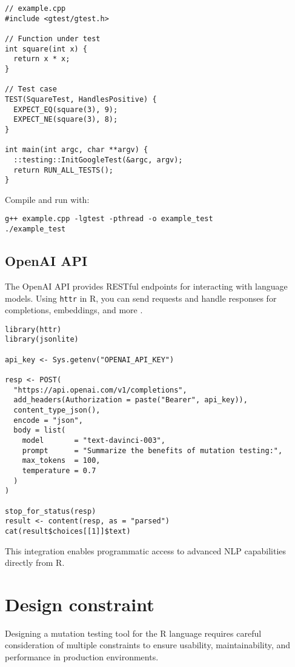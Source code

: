 \begin{verbatim}
// example.cpp
#include <gtest/gtest.h>

// Function under test
int square(int x) {
  return x * x;
}

// Test case
TEST(SquareTest, HandlesPositive) {
  EXPECT_EQ(square(3), 9);
  EXPECT_NE(square(3), 8);
}

int main(int argc, char **argv) {
  ::testing::InitGoogleTest(&argc, argv);
  return RUN_ALL_TESTS();
}
\end{verbatim}

Compile and run with:
\begin{verbatim}
g++ example.cpp -lgtest -pthread -o example_test
./example_test
\end{verbatim}

\subsection{OpenAI API}

The OpenAI API provides RESTful endpoints for interacting with language models. Using \texttt{httr} in R, you can send requests and handle responses for completions, embeddings, and more \cite{openai2023api}.

\begin{verbatim}
library(httr)
library(jsonlite)

api_key <- Sys.getenv("OPENAI_API_KEY")

resp <- POST(
  "https://api.openai.com/v1/completions",
  add_headers(Authorization = paste("Bearer", api_key)),
  content_type_json(),
  encode = "json",
  body = list(
    model       = "text-davinci-003",
    prompt      = "Summarize the benefits of mutation testing:",
    max_tokens  = 100,
    temperature = 0.7
  )
)

stop_for_status(resp)
result <- content(resp, as = "parsed")
cat(result$choices[[1]]$text)
\end{verbatim}

This integration enables programmatic access to advanced NLP capabilities directly from R.


\section{Design constraint}

Designing a mutation testing tool for the R language requires careful consideration of multiple constraints to ensure usability, maintainability, and performance in production environments.

